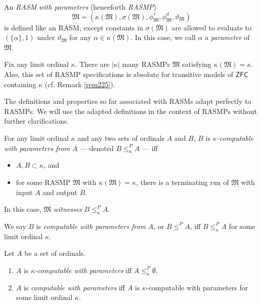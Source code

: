 \documentclass[12pt]{article}
\numberwithin{equation}{section}
\begin{document}
\begin{defi}
An \emph{RASM with parameters} (henceforth \emph{RASMP}) 
\begin{equation*}
    \mathfrak{M} = (\kappa(\mathfrak{M}), \sigma(\mathfrak{M}), \phi^{\tau}_{\mathfrak{M}}, \phi^d_{\mathfrak{M}}, \vartheta_{\mathfrak{M}})
\end{equation*} 
is defined like an RASM, except constants in $\sigma(\mathfrak{M})$ are allowed to evaluate to $(\{\alpha\}, 1)$ under $\vartheta_{\mathfrak{M}}$ for any $\alpha \in \kappa(\mathfrak{M})$. In this case, we call $\alpha$ a \emph{parameter} of $\mathfrak{M}$.
\end{defi}

\begin{rem}\label{rem248}
Fix any limit ordinal $\kappa$. There are $|\kappa|$ many RASMPs $\mathfrak{M}$ satisfying $\kappa(\mathfrak{M}) = \kappa$. Also, this set of RASMP specifications is absolute for transitive models of $\mathsf{ZFC}$ containing $\kappa$ (cf. Remark \ref{rem225}).
\end{rem}

The definitions and properties so far associated with RASMs adapt perfectly to RASMPs. We will use the adapted definitions in the context of RASMPs without further clarifications.

\begin{defi}\label{def38}
For any limit ordinal $\kappa$ and any two sets of ordinals $A$ and $B$, $B$ is $\kappa$\emph{-computable with parameters from} $A$ --- denoted $B \leq^P_{\kappa} A$ --- iff 
\begin{itemize}
    \item $A, B \subset \kappa$, and
    \item for some RASMP $\mathfrak{M}$ with $\kappa(\mathfrak{M}) = \kappa$, there is a terminating run of $\mathfrak{M}$ with input $A$ and output $B$. 
\end{itemize}
In this case, $\mathfrak{M}$ \emph{witnesses} $B \leq^P_{\kappa} A$.
\end{defi}

\begin{defi}
We say $B$ is \emph{computable with parameters from} $A$, or $B \leq^P A$, iff $B \leq^P_{\kappa} A$ for some limit ordinal $\kappa$.
\end{defi}

\begin{defi}
Let $A$ be a set of ordinals.
\begin{enumerate}[label=(\arabic*)]
    \item $A$ is $\kappa$\emph{-computable with parameters} iff $A \leq^P_{\kappa} \emptyset$.
    \item $A$ is \emph{computable with parameters} iff $A$ is $\kappa$-computable with parameters for some limit ordinal $\kappa$.
\end{enumerate}
\end{defi}
\end{document}
